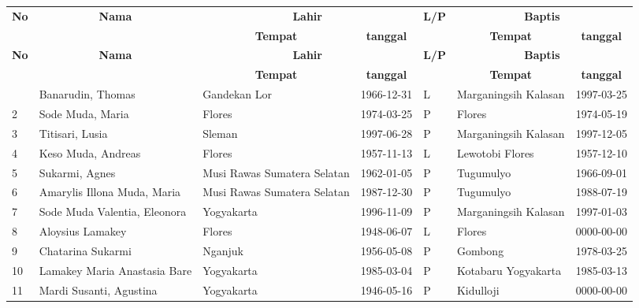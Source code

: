 \begin{longtable}{|m{5mm}|m{45mm}|m{20mm}|m{20mm}|m{5mm}|m{25mm}|m{20mm}|} 
	\hline  
	\multicolumn{1}{|c|}{\multirow{2}{*}{\textbf{No}}} & \multicolumn{1}{|c|}{\multirow{2}{*}{\textbf{Nama}}} 
	& \multicolumn{2}{|c|}{\textbf{Lahir}} 
	& \multicolumn{1}{|c|}{\multirow{2}{*}{\textbf{L/P}}}
	&\multicolumn{2}{|c|}{\textbf{Baptis}}  \\ \cline{3-4}\cline{6-7}
	&
	&\multicolumn{1}{|c|}{\textbf{Tempat}} & \multicolumn{1}{|c|}{\textbf{tanggal}} 
	&
	&\multicolumn{1}{|c|}{\textbf{Tempat}} & \multicolumn{1}{|c|}{\textbf{tanggal}} \\ 
	\hline \hline  \endfirsthead 
	\hline  
	\multicolumn{1}{|c|}{\multirow{2}{*}{\textbf{No}}} & \multicolumn{1}{|c|}{\multirow{2}{*}{\textbf{Nama}}} 
	& \multicolumn{2}{|c|}{\textbf{Lahir}} & 
	\multicolumn{1}{|c|}{\multirow{2}{*}{\textbf{L/P}}}
	& \multicolumn{2}{|c|}{\textbf{Baptis}}  \\ \cline{3-4}\cline{6-7}
	&
	&\multicolumn{1}{|c|}{\textbf{Tempat}} & \multicolumn{1}{|c|}{\textbf{tanggal}} 
	&
	&\multicolumn{1}{|c|}{\textbf{Tempat}} & \multicolumn{1}{|c|}{\textbf{tanggal}} \\ 
	\hline \hline \endhead \endfoot
	1&Banarudin, Thomas&Gandekan Lor&1966-12-31&L&Marganingsih Kalasan&1997-03-25\\ \hline 
	2&Sode Muda, Maria&Flores&1974-03-25&P&Flores&1974-05-19\\ \hline 
	3&Titisari, Lusia&Sleman&1997-06-28&P&Marganingsih Kalasan&1997-12-05\\ \hline 
	4&Keso Muda, Andreas&Flores&1957-11-13&L&Lewotobi Flores&1957-12-10\\ \hline 
	5&Sukarmi, Agnes&Musi Rawas Sumatera Selatan&1962-01-05&P&Tugumulyo&1966-09-01\\ \hline 
	6&Amarylis Illona Muda, Maria&Musi Rawas Sumatera Selatan&1987-12-30&P&Tugumulyo&1988-07-19\\ \hline 
	7&Sode Muda Valentia, Eleonora&Yogyakarta&1996-11-09&P&Marganingsih Kalasan&1997-01-03\\ \hline 
	8&Aloysius Lamakey&Flores&1948-06-07&L&Flores&0000-00-00\\ \hline 
	9&Chatarina Sukarmi&Nganjuk&1956-05-08&P&Gombong&1978-03-25\\ \hline 
	10&Lamakey Maria Anastasia Bare&Yogyakarta&1985-03-04&P&Kotabaru Yogyakarta&1985-03-13\\ \hline 
	11&Mardi Susanti, Agustina&Yogyakarta&1946-05-16&P&Kidulloji&0000-00-00\\ \hline 

\end{longtable}
